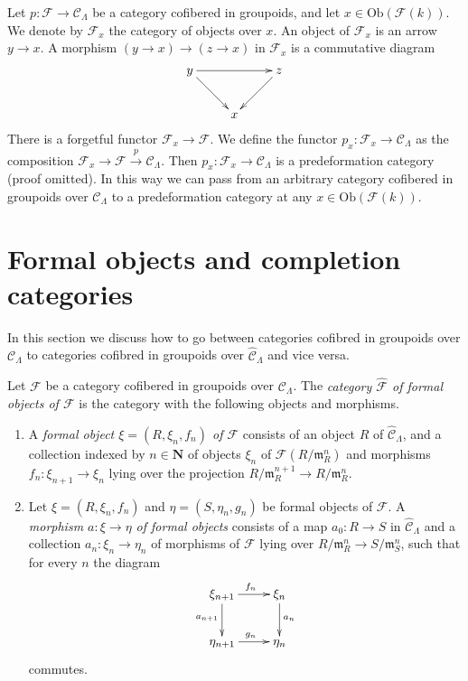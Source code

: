 \begin{remark}
\label{remark-localize-cofibered-groupoid} 
Let $p: \mathcal{F} \to \mathcal{C}_\Lambda$ be a category cofibered in 
groupoids, and let $x \in \text{Ob}(\mathcal{F}(k))$.  We denote by 
$\mathcal{F}_{x}$ the category of objects over $x$.
An object of $\mathcal{F}_x$ is an arrow $y \to x$.
A morphism $(y \to x) \to (z \to x)$ in $\mathcal{F}_x$ is a commutative 
diagram
$$
\xymatrix{
y \ar[rr] \ar[dr] & & z \ar[dl] \\
& x &
}
$$
There is a forgetful functor $\mathcal{F}_{x} \to \mathcal{F}$. We define 
the functor $p_x : \mathcal{F}_{x} \to \mathcal{C}_\Lambda$ as the 
composition
$\mathcal{F}_x \to \mathcal{F} \xrightarrow{p} \mathcal{C}_\Lambda$.
Then $p_x : \mathcal{F}_x \to \mathcal{C}_\Lambda$ is a 
predeformation category (proof omitted). In this way we can pass from an
arbitrary category cofibered in groupoids over $\mathcal{C}_\Lambda$
to a predeformation category at any $x \in \text{Ob}(\mathcal{F}(k))$.
\end{remark}






\section{Formal objects and completion categories}
\label{section-formal-objects}

\noindent
In this section we discuss how to go between categories cofibred in
groupoids over $\mathcal{C}_\Lambda$ to categories cofibred in
groupoids over $\widehat{\mathcal{C}}_\Lambda$ and vice versa.

\begin{definition}
\label{definition-formal-objects}
Let $\mathcal{F}$ be a category cofibered in groupoids over
$\mathcal{C}_\Lambda$. The {\it category $\widehat{\mathcal{F}}$ of formal
objects of  $\mathcal{F}$} is the category with the following objects and
morphisms.
\begin{enumerate}
\item A {\it formal object $\xi = (R, \xi_n, f_n)$ of $\mathcal{F}$} 
consists of an object $R$ of $\widehat{\mathcal{C}}_\Lambda$, and a collection 
indexed by $n \in \mathbf{N}$ of objects $\xi_{n}$ of
$\mathcal{F}(R/\mathfrak m_R^n)$ and morphisms
$f_n : \xi_{n + 1} \to \xi_n$ lying over the projection
$R/\mathfrak m_R^{n + 1} \to R/\mathfrak m_R^n$.
\item Let $\xi = (R, \xi_n, f_n)$ and $\eta = (S, \eta_n, g_n)$ be 
formal objects of $\mathcal{F}$.  A {\it morphism $a: \xi \to \eta$ of 
formal objects} consists of a map $a_0 : R \to S$ in
$\widehat{\mathcal{C}}_\Lambda$ and a collection $a_n : \xi_n \to \eta_n$
of morphisms of $\mathcal{F}$ lying over
$R/\mathfrak m_R^n \to S/\mathfrak m_S^n$, 
such that for every $n$ the diagram
$$
\xymatrix{
\xi_{n + 1} \ar[r]^{f_n} \ar[d]_{a_{n + 1}} & \xi_n \ar[d]^{a_n} \\
\eta_{n + 1} \ar[r]^{g_n} & \eta_n
}
$$
commutes.
\end{enumerate}
\end{definition}

